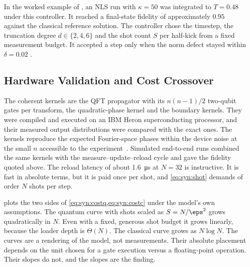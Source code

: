In the worked example of \cite{guo2026nonlinearwaves}, an NLS run with $\kappa=50$ was integrated to $T=0.48$ under this controller. It reached a final-state fidelity of approximately $0.95$ against the classical reference solution. The controller chose the timestep, the truncation degree $d\in\{2,4,6\}$ and the shot count $S$ per half-kick from a fixed measurement budget. It accepted a step only when the norm defect stayed within $\delta=0.02$ \cite{guo2026nonlinearwaves}.

\subsection{Hardware Validation and Cost Crossover}\label{sec:syn:waves-results}

The coherent kernels are the QFT propagator with its $n(n-1)/2$ two-qubit gates per transform, the quadratic-phase kernel and the boundary kernels. They were compiled and executed on an IBM Heron superconducting processor, and their measured output distributions were compared with the exact ones. The kernels reproduce the expected Fourier-space phases within the device noise at the small $n$ accessible to the experiment~\cite{guo2026nonlinearwaves}. Simulated end-to-end runs combined the same kernels with the measure--update--reload cycle and gave the fidelity quoted above. The reload latency of about \SI{1.6}{\micro\second} at $N=32$ is instructive. It is fast in absolute terms, but it is paid once per shot, and \cref{eq:syn:shot} demands of order $N$ shots per step.

 plots the two sides of \cref{eq:syn:costq,eq:syn:costc} under the model's own assumptions. The quantum curve with shots scaled as $S=N/\eps^{2}$ grows quadratically in $N$. Even with a fixed, generous shot budget it grows linearly, because the loader depth is $\Theta(N)$. The classical curve grows as $N\log N$. The curves are a rendering of the model, not measurements. Their absolute placement depends on the unit chosen for a gate execution versus a floating-point operation. Their slopes do not, and the slopes are the finding.

